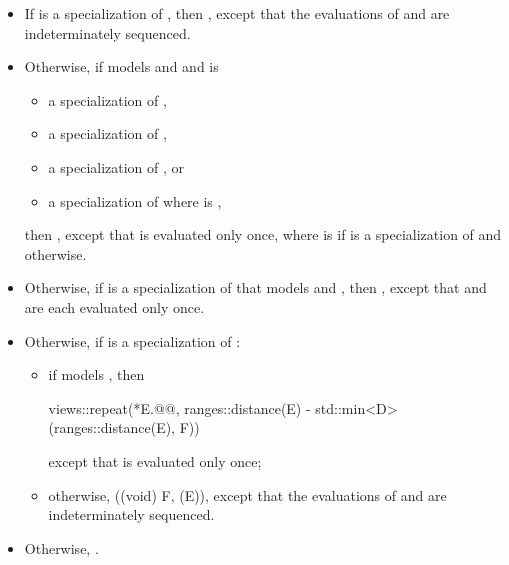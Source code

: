 \begin{itemize}
\item
If  is a specialization of
,
then ,
except that the evaluations of  and 
are indeterminately sequenced.

\item
Otherwise, if  models
 and 
and is
\begin{itemize}
\item a specialization of ,
\item a specialization of ,
\item a specialization of , or
\item a specialization of 
where  is ,
\end{itemize}
then ,
except that  is evaluated only once,
where  is 
if  is a specialization of  and  otherwise.

\item
Otherwise,
if  is
a specialization of 
that models  and ,
then
,
except that  and  are each evaluated only once.

\item
Otherwise, if  is
a specialization of :
\begin{itemize}
\item
if  models ,
then
\begin{codeblock}
views::repeat(*E.@@, ranges::distance(E) - std::min<D>(ranges::distance(E), F))
\end{codeblock}
except that  is evaluated only once;
\item
otherwise, ((void) F, (E)),
except that the evaluations of  and  are indeterminately sequenced.
\end{itemize}

\item
Otherwise, .
\end{itemize}

